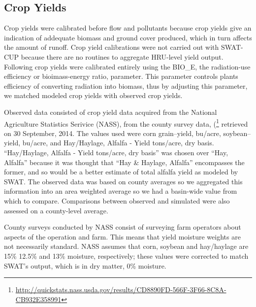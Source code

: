\subsection{Crop Yields}

Crop yields were calibrated before flow and pollutants because crop yields give an indication of addequate biomass and ground cover produced, which in turn affects the amount of runoff. Crop yield calibrations were not carried out with SWAT-CUP because there are no routines to aggregate HRU-level yield output. Following \citet{baumgart_source_2005} crop yields were calibrated entirely using the BIO\_E, the radiation-use efficiency or bioimass-energy ratio, parameter. This parameter controls plants efficiency of converting radiation into biomass, thus by adjusting this parameter, we matched modeled crop yields with observed crop yields.

Observed data consisted of crop yield data acquired from the National Agriculture Statistics Serivice (NASS), from the county survey data, (\footnote{\url{http://quickstats.nass.usda.gov/results/CD8890FD-566F-3F66-8C8A-CB932E358991}} retrieved on 30 September, 2014. The values used were corn grain--yield, bu/acre, soybean--yield, bu/acre, and Hay/Haylage, Alfalfa - Yield tons/acre, dry basis. ``Hay/Haylage, Alfalfa - Yield tons/acre, dry basis'' was chosen over ``Hay, Alfalfa'' because it was thought that ``Hay \& Haylage, Alfalfa'' encompasses the former, and so would be a better estimate of total alfalfa yield as modeled by SWAT. The observed data was based on county averages so we aggregated this information into an area weighted average so we had a basin-wide value from which to compare. Comparisons between observed and simulated were also assessed on a county-level average.



County surveys conducted by NASS consist of surveying farm operators about aspects of the operation and farm. This means that yield moisture weights are not necessarily standard. NASS assumes that corn, soybean and hay/haylage are 15\% 12.5\% and 13\% moisture, respectively; these values were corrected to match SWAT's output, which is in dry matter, 0\% moisture. 


